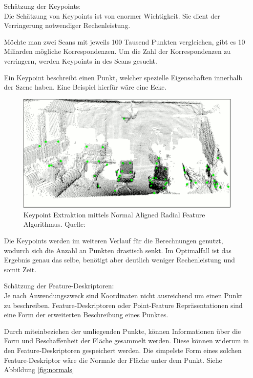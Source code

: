 Schätzung der Keypoints: \\
Die Schätzung von Keypoints ist von enormer Wichtigkeit.
Sie dient der Verringerung notwendiger Rechenleistung.

Möchte man zwei Scans mit jeweils 100 Tausend Punkten vergleichen, gibt es 10 Miliarden mögliche Korrespondenzen.
Um die Zahl der Korrespondenzen zu verringern, werden Keypoints in des Scans gesucht.

Ein Keypoint beschreibt einen Punkt, welcher spezielle Eigenschaften innerhalb der Szene haben.
Eine Beispiel hierfür wäre eine Ecke.

\begin{figure}[H]
    \centering
    \includegraphics[width=12cm]{graphics/keypoint.png}
    \caption{Keypoint Extraktion mittels Normal Aligned Radial Feature Algorithmus. Quelle: \cite{keypoints2023}}
    \label{fig:keypoints}
\end{figure}

Die Keypoints werden im weiteren Verlauf für die Berechnungen genutzt, wodurch sich die Anzahl an Punkten drastisch senkt.
Im Optimalfall ist das Ergebnis genau das selbe, benötigt aber deutlich weniger Rechenleistung und somit Zeit.
\newline

Schätzung der Feature-Deskriptoren: \\
Je nach Anwendungszweck sind Koordinaten nicht ausreichend um einen Punkt zu beschreiben.
Feature-Deskriptoren oder Point-Feature Repräsentationen sind eine Form der erweiterten Beschreibung eines Punktes.

Durch miteinbeziehen der umliegenden Punkte, können Informationen über die Form und Beschaffenheit der Fläche gesammelt werden.
Diese können widerum in den Feature-Deskriptoren gespeichert werden.
Die simpelste Form eines solchen Feature-Deskriptor wäre die Normale der Fläche unter dem Punkt. Siehe Abbildung \ref{fig:normals}

